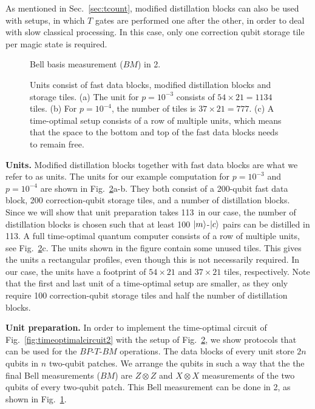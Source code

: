 \documentclass[prx,aps,letterpaper,twocolumn,allowfontchageintitle=true,accepted=2019-02-01]{quantumarticle}
\begin{document}
As mentioned in Sec.~\ref{sec:tcount}, modified distillation blocks can also be used with setups, in which $T$ gates are performed one after the other, in order to deal with slow classical processing. In this case, only one correction qubit storage tile per magic state is required.

\begin{figure}[b!]
\centering
\def\svgwidth{\linewidth}

\caption{Bell basis measurement ($BM$) in 2\clock.}
\label{fig:bellmeasurement}
\end{figure}

\begin{figure}[t!]
\centering
\def\svgwidth{0.97\linewidth}

\caption{Units consist of fast data blocks, modified distillation blocks and storage tiles. (a) The unit for $p=10^{-3}$ consists of $54 \times 21 = 1134$ tiles. (b) For $p=10^{-4}$, the number of tiles is $37 \times 21 = 777$. (c) A time-optimal setup consists of a row of multiple units, which means that the space to the bottom and top of the fast data blocks needs to remain free.}
\label{fig:units}
\end{figure}

\textbf{Units.} Modified distillation blocks together with fast data blocks are what we refer to as units. The units for our example computation for $p=10^{-3}$ and $p=10^{-4}$ are shown in Fig.~\ref{fig:units}a-b. They both consist of a 200-qubit fast data block, 200 correction-qubit storage tiles, and a number of distillation blocks. Since we will show that unit preparation takes 113\clock \ in our case, the number of distillation blocks is chosen such that at least 100 $\ket{m}$-$\ket{c}$ pairs can be distilled in 113\clock. A full time-optimal quantum computer consists of a row of multiple units, see Fig.~\ref{fig:units}c. The units shown in the figure contain some unused tiles. This gives the units a rectangular profiles, even though this is not necessarily required. In our case, the units have a footprint of $54 \times 21$ and $37 \times 21$ tiles, respectively. Note that the first and last unit of a time-optimal setup are smaller, as they only require 100 correction-qubit storage tiles and half the number of distillation blocks.






\textbf{Unit preparation.} In order to implement the time-optimal circuit of Fig.~\ref{fig:timeoptimalcircuit2} with the setup of Fig.~\ref{fig:units}, we show protocols that can be used for the $BP$-$T$-$BM$ operations. The data blocks of every unit store $2n$ qubits in $n$ two-qubit patches. We arrange the qubits in such a way that the the final Bell measurements ($BM$) are $Z\otimes Z$ and $X \otimes X$ measurements of the two qubits of every two-qubit patch. This Bell measurement can be done in 2\clock, as shown in Fig.~\ref{fig:bellmeasurement}.
\end{document}
